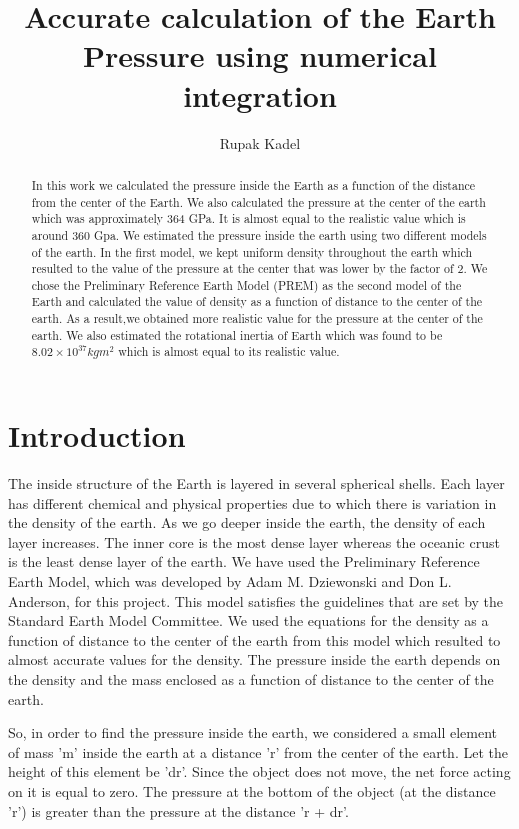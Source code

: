 \documentclass[12pt]{article}
\title{Accurate calculation of the Earth Pressure using numerical integration}
\author{Rupak Kadel}
\begin{document}
\maketitle

\begin{abstract}
In this work we calculated the pressure inside the Earth as a function of the distance from the center of the Earth. We also calculated the pressure at the center of the earth which was approximately 364 GPa. It is almost equal to the realistic value which is around 360 Gpa. We estimated the pressure inside the earth using two different models of the earth. In the first model, we kept uniform density throughout the earth which resulted to the value of the pressure at the center that was lower by the factor of 2. We chose the Preliminary Reference Earth Model (PREM) as the second model of the Earth and calculated the value of density as a function of distance to the center of the earth. As a result,we obtained more realistic value for the pressure at the center of the earth. We also estimated the rotational inertia of Earth which was found to be $8.02 \times 10^{37} kgm^{2}$ which is almost equal to its realistic value.
\end{abstract}

\section{Introduction}
The inside structure of the Earth is layered in several spherical shells. Each layer has different chemical and physical properties due to which there is variation in the density of the earth. As we go deeper inside the earth, the density of each layer increases. The inner core is the most dense layer whereas the oceanic crust is the least dense layer of the earth. We have used the Preliminary Reference Earth Model, which was developed by Adam M. Dziewonski and Don L. Anderson, for this project. This model satisfies the guidelines that are set by the Standard Earth Model Committee. We used the equations for the density as a function of distance to the center of the earth from this model which resulted to almost accurate values for the density. The pressure inside the earth depends on the density and the mass enclosed as a function of distance to the center of the earth.

So, in order to find the pressure inside the earth, we considered a small element of mass 'm' inside the earth at a distance 'r' from the center of the earth. Let the height of this element be 'dr'. Since the object does not move, the net force acting on it is equal to zero. The pressure at the bottom of the object (at the distance 'r') is greater than the pressure at the distance 'r + dr'.  
\end{document}

